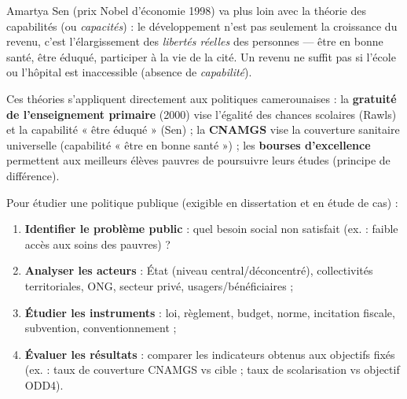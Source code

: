 \documentclass[11pt]{article}
\newcommand{\cle}[1]{{\popxbold\color{popdark}#1}}
\begin{document}
Amartya \cle{Sen} (prix Nobel d'économie 1998) va plus loin avec la théorie des \cle{capabilités} (ou \emph{capacités}) : le développement n'est pas seulement la croissance du revenu, c'est l'élargissement des \emph{libertés réelles} des personnes — être en bonne santé, être éduqué, participer à la vie de la cité. Un revenu ne suffit pas si l'école ou l'hôpital est inaccessible (absence de \emph{capabilité}).

Ces théories s'appliquent directement aux politiques camerounaises : la \textbf{gratuité de l'enseignement primaire} (2000) vise l'égalité des chances scolaires (Rawls) et la capabilité « être éduqué » (Sen) ; la \textbf{CNAMGS} vise la couverture sanitaire universelle (capabilité « être en bonne santé ») ; les \textbf{bourses d'excellence} permettent aux meilleurs élèves pauvres de poursuivre leurs études (principe de différence).

\begin{methode}
Pour étudier une politique publique (exigible en dissertation et en étude de cas) :
\begin{enumerate}
\item \textbf{Identifier le problème public} : quel besoin social non satisfait (ex. : faible accès aux soins des pauvres) ?
\item \textbf{Analyser les acteurs} : État (niveau central/déconcentré), collectivités territoriales, ONG, secteur privé, usagers/bénéficiaires ;
\item \textbf{Étudier les instruments} : loi, règlement, budget, norme, incitation fiscale, subvention, conventionnement ;
\item \textbf{Évaluer les résultats} : comparer les indicateurs obtenus aux objectifs fixés (ex. : taux de couverture CNAMGS vs cible ; taux de scolarisation vs objectif ODD4).
\end{enumerate}
\end{methode}
\end{document}

